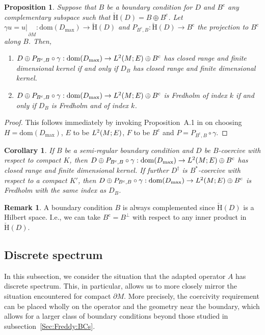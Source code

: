 \documentclass[a4paper,10pt,reqno]{amsart}
\newcommand{\rest}[1]{{{\lvert_{}}_{}}_{#1}}
\newcommand{\Lp}[2][{}]{{\rm L}^{#2}_{\rm #1}}%
\newcommand{\checkH}{\check{\mathrm{H}}}
\newcommand{\rc}{\mathrm{c}}
\newcommand{\dom}{\mathrm{dom}}
\newcommand{\dM}{\partial M}
\newtheorem{corollary}[theorem]{Corollary}
\newtheorem{proposition}[theorem]{Proposition}
\theoremstyle{definition}
\newtheorem{remark}[theorem]{Remark}
\begin{document}
\begin{proposition}
\label{Prop:Solv}
Suppose that $B$ be a boundary condition for $D$ and $B^{\rc}$ any complementary subspace such that $\checkH(D) = B \oplus B^{\rc}$.
Let $\gamma u = u \rest{\dM}: \dom(D_{\max}) \to \checkH(D)$ and $P_{B^{\rc}, B}: \checkH(D) \to B^{\rc}$ the projection to $B^{\rc}$ along $B$.
Then,
\begin{enumerate}
\item
      $D \oplus P_{B^{\rc},B} \circ \gamma: \dom(D_{\max}) \to \Lp{2}(M;E) \oplus B^{\rc}$ has closed range and finite dimensional kernel if and only if $D_B$ has closed range and finite dimensional kernel.
\item
      $D \oplus P_{B^{\rc},B}\circ \gamma: \dom(D_{\max}) \to \Lp{2}(M;E) \oplus B^{\rc}$ is Fredholm of index $k$ if and only if $D_B$ is Fredholm and of index $k$.
\end{enumerate}
\end{proposition}
\begin{proof}
This follows immediately by invoking Proposition~A.1 in \cite{BB12} on choosing $H = \dom(D_{\max})$, $E$ to be $\Lp{2}(M;E)$, $F$ to be $B^{\rc}$ and $P = P_{B^{\rc},B} \circ \gamma$.
\end{proof}

\begin{corollary}
\label{Cor:Solv}
If  $B$ be a semi-regular boundary condition and $D$ be $B$-coercive with respect to compact $K$, then $D \oplus P_{B^{\rc},B} \circ \gamma: \dom(D_{\max}) \to \Lp{2}(M;E) \oplus B^{\rc}$ has closed range and finite dimensional kernel.
If further $D^\dagger$ is $B^\ast$-coercive with respect to a compact $K'$, then $D \oplus P_{B^{\rc},B} \circ \gamma: \dom(D_{\max}) \to \Lp{2}(M;E) \oplus B^{\rc}$ is Fredholm with the same index as $D_B$.
\end{corollary}

\begin{remark}
A boundary condition $B$ is always complemented since $\checkH(D)$ is a Hilbert space.
I.e., we can take $B^{\rc} = B^{\perp}$ with respect to any inner product in $\checkH(D)$.
\end{remark}

\subsection{Discrete spectrum} 
\label{Sec:Freddy:Discrete} 

In this subsection, we consider the situation that the adapted operator $A$ has discrete spectrum.
This, in particular, allows us to more closely mirror the situation encountered for compact $\dM$. 
More precisely, the coercivity requirement can be placed wholly on the operator and the geometry near the boundary, which allows for a larger class of boundary conditions beyond those studied in subsection~\ref{Sec:Freddy:BCs}.
\end{document}
